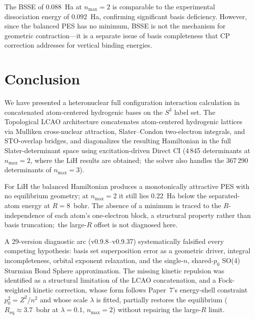 \documentclass[aps,pra,twocolumn,superscriptaddress,longbibliography]{revtex4-2}
\begin{document}
The BSSE of $0.088$~Ha at $n_{\max}=2$ is comparable to the
experimental dissociation energy of $0.092$~Ha, confirming significant
basis deficiency.  However, since the balanced PES has no
minimum, BSSE is not the mechanism for geometric contraction---it is a
separate issue of basis completeness that CP correction addresses for
vertical binding energies.

\section{Conclusion}
\label{sec:conclusion}

We have presented a heteronuclear full configuration interaction
calculation in concatenated atom-centered hydrogenic bases on the $S^3$
label set.  The Topological LCAO
architecture concatenates atom-centered hydrogenic lattices via Mulliken
cross-nuclear attraction, Slater--Condon two-electron integrals, and
STO-overlap bridges, and diagonalizes the resulting Hamiltonian in the
full Slater-determinant space using excitation-driven Direct CI
(4\,845 determinants at $n_{\max}=2$, where the LiH results are
obtained;\ the solver also handles the 367\,290 determinants of
$n_{\max}=3$).

For LiH the balanced Hamiltonian produces a monotonically attractive
PES with no equilibrium geometry; at $n_{\max}=2$ it still lies 0.22~Ha
below the separated-atom energy at $R=8$~bohr.  The absence of a
minimum is traced to the $R$-independence of each atom's one-electron
block, a structural property rather than basis truncation;\ the
large-$R$ offset is not diagnosed here.

A 29-version diagnostic arc (v0.9.8--v0.9.37) systematically falsified
every competing hypothesis: basis set superposition error as a geometric
driver, integral incompleteness, orbital exponent relaxation, and the
single-$n$, shared-$p_0$ SO(4) Sturmian Bond Sphere approximation.  The
missing kinetic repulsion was identified as a structural limitation of
the LCAO concatenation, and a Fock-weighted kinetic correction, whose
form follows Paper~7's energy-shell constraint $p_0^2 = Z^2/n^2$ and
whose scale $\lambda$ is fitted, partially restores the
equilibrium ($R_{\mathrm{eq}} \approx 3.7$~bohr at $\lambda = 0.1$,
$n_{\max}=2$) without repairing the large-$R$ limit.
\end{document}
